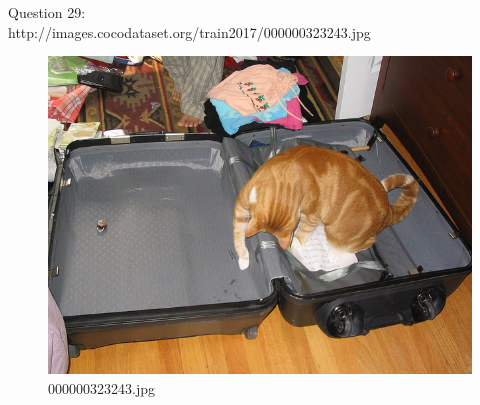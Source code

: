     Question 29:\\http://images.cocodataset.org/train2017/000000323243.jpg
    \begin{figure}[h]
        \centering
        \includegraphics[width=0.8\linewidth]{../image set/easy/000000323243.jpg}
        \caption{000000323243.jpg}
    \end{figure}
